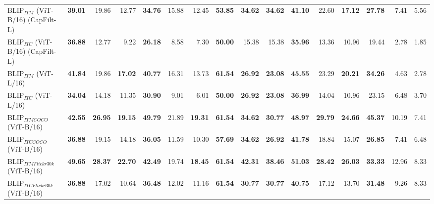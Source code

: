 \begin{table}[ht]
\begin{adjustbox}{max width=\textwidth}
\begin{tabular}{l|rrr|rrr|rrr|rrr|rrr}
 BLIP$_{ITM}$ (ViT-B/16) (CapFilt-L) & \textbf{39.01} & 19.86          & 12.77          & \textbf{34.76} & 15.88          & 12.45          & \textbf{53.85} & \textbf{34.62} & \textbf{34.62} & \textbf{41.10} & 22.60          & \textbf{17.12} & \textbf{27.78} & 7.41           & 5.56           \\
 BLIP$_{ITC}$ (ViT-B/16) (CapFilt-L) & \textbf{36.88} & 12.77          & 9.22           & \textbf{26.18} & 8.58           & 7.30           & \textbf{50.00} & 15.38          & 15.38          & \textbf{35.96} & 13.36          & 10.96          & 19.44          & 2.78           & 1.85           \\
 BLIP$_{ITM}$ (ViT-L/16)             & \textbf{41.84} & 19.86          & \textbf{17.02} & \textbf{40.77} & 16.31          & 13.73          & \textbf{61.54} & \textbf{26.92} & \textbf{23.08} & \textbf{45.55} & 23.29          & \textbf{20.21} & \textbf{34.26} & 4.63           & 2.78           \\
 BLIP$_{ITC}$ (ViT-L/16)             & \textbf{34.04} & 14.18          & 11.35          & \textbf{30.90} & 9.01           & 6.01           & \textbf{50.00} & \textbf{26.92} & \textbf{23.08} & \textbf{36.99} & 14.04          & 10.96          & 23.15          & 6.48           & 3.70           \\
 BLIP$_{ITM COCO}$ (ViT-B/16)        & \textbf{42.55} & \textbf{26.95} & \textbf{19.15} & \textbf{49.79} & 21.89          & \textbf{19.31} & \textbf{61.54} & \textbf{34.62} & \textbf{30.77} & \textbf{48.97} & \textbf{29.79} & \textbf{24.66} & \textbf{45.37} & 10.19          & 7.41           \\
 BLIP$_{ITC COCO}$ (ViT-B/16)        & \textbf{36.88} & 19.15          & 14.18          & \textbf{36.05} & 11.59          & 10.30          & \textbf{57.69} & \textbf{34.62} & \textbf{26.92} & \textbf{41.78} & 18.84          & 15.07          & \textbf{26.85} & 7.41           & 6.48           \\
 BLIP$_{ITM Flickr30k}$ (ViT-B/16)   & \textbf{49.65} & \textbf{28.37} & \textbf{22.70} & \textbf{42.49} & 19.74          & \textbf{18.45} & \textbf{61.54} & \textbf{42.31} & \textbf{38.46} & \textbf{51.03} & \textbf{28.42} & \textbf{26.03} & \textbf{33.33} & 12.96          & 8.33           \\
 BLIP$_{ITC Flickr30k}$ (ViT-B/16)   & \textbf{36.88} & 17.02          & 10.64          & \textbf{36.48} & 12.02          & 11.16          & \textbf{61.54} & \textbf{30.77} & \textbf{30.77} & \textbf{40.75} & 17.12          & 13.70          & \textbf{31.48} & 9.26           & 8.33           \\

\end{tabular}
\end{adjustbox}
\end{table}
